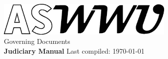 \documentclass[10pt, letterpaper]{article}
\begin{document}
\nolinenumbers
\begin{titlepage}
    \begin{center}
        \vspace*{5cm}
  		\includegraphics[width=0.65\textwidth]{Formatting/Logo_ASWWU-Black}\\
        \LARGE Governing Documents\\ \Huge \textbf{Judiciary Manual}
        \vfill
        \normalsize Last compiled: \today\ \currenttime
             
    \end{center}
 \end{titlepage}
\linenumbers
\newpage
\end{document}

